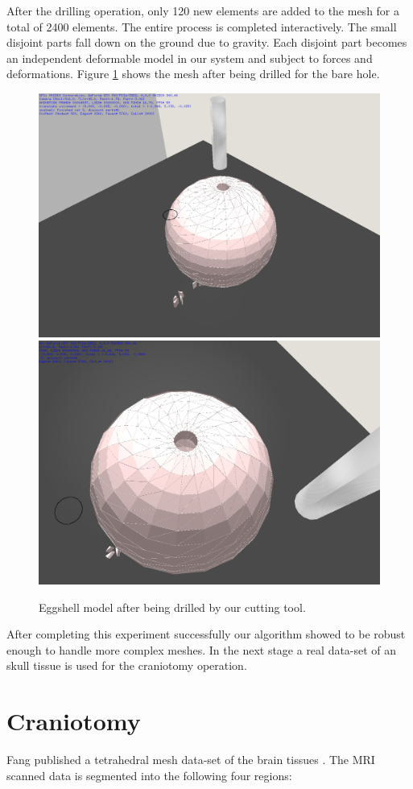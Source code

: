 After the drilling operation, only 120 new elements are added to the mesh for a total of 2400 elements. The entire process is completed 
interactively. The small disjoint parts fall down on the ground due to gravity. Each disjoint part becomes an independent
deformable model in our system and subject to forces and deformations. Figure \ref{fig:eggshell02} shows the mesh after being 
drilled for the bare hole.


\begin{figure}[H]
  \centering
  \includegraphics[width=0.6\linewidth]{figures/evaluation/eggshell02.png}
  \includegraphics[width=0.6\linewidth]{figures/evaluation/eggshell03.png}
  \caption{\label{fig:eggshell02}
  {Eggshell model after being drilled by our cutting tool.}
}
\end{figure}

After completing this experiment successfully our algorithm showed to be robust enough to handle 
more complex meshes. In the next stage a real data-set of an skull tissue is used for the craniotomy operation.

\section{Craniotomy}
\label{sec:craniotomy}
Fang \etal published a tetrahedral mesh data-set of the brain tissues \cite{fang2010mesh}. The MRI scanned data is 
segmented into the following four regions:

